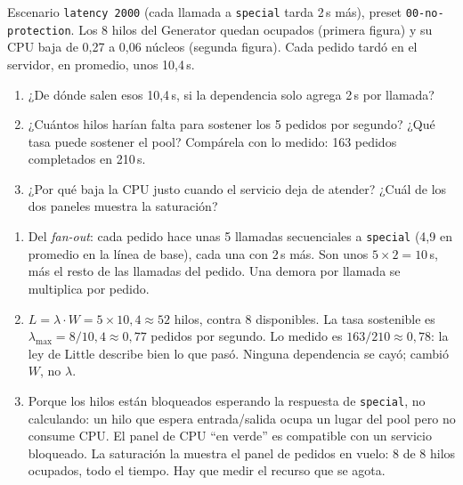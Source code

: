 \documentclass[variant=guia,cover=institutional,mode=screen]{ua-engineering-v6-article}
\begin{document}
\begin{uaexercise}
Escenario \texttt{latency 2000} (cada llamada a \texttt{special} tarda 2\,s más), preset \texttt{00-no-protection}. Los 8 hilos del Generator quedan ocupados (primera figura) y su CPU baja de 0,27 a 0,06 núcleos (segunda figura). Cada pedido tardó en el servidor, en promedio, unos 10,4\,s.
\begin{enumerate}
\item ¿De dónde salen esos 10,4\,s, si la dependencia solo agrega 2\,s por llamada?
\item ¿Cuántos hilos harían falta para sostener los 5 pedidos por segundo? ¿Qué tasa puede sostener el pool? Compárela con lo medido: 163 pedidos completados en 210\,s.
\item ¿Por qué baja la CPU justo cuando el servicio deja de atender? ¿Cuál de los dos paneles muestra la saturación?
\end{enumerate}
\end{uaexercise}
\begin{uaanswer}
\begin{enumerate}
\item Del \emph{fan-out}: cada pedido hace unas 5 llamadas secuenciales a \texttt{special} (4,9 en promedio en la línea de base), cada una con 2\,s más. Son unos $5 \times 2 = 10$\,s, más el resto de las llamadas del pedido. Una demora por llamada se multiplica por pedido.
\item $L = \lambda \cdot W = 5 \times 10{,}4 \approx 52$ hilos, contra 8 disponibles. La tasa sostenible es $\lambda_{\max} = 8 / 10{,}4 \approx 0{,}77$ pedidos por segundo. Lo medido es $163 / 210 \approx 0{,}78$: la ley de Little describe bien lo que pasó. Ninguna dependencia se cayó; cambió $W$, no $\lambda$.
\item Porque los hilos están bloqueados esperando la respuesta de \texttt{special}, no calculando: un hilo que espera entrada/salida ocupa un lugar del pool pero no consume CPU. El panel de CPU ``en verde'' es compatible con un servicio bloqueado. La saturación la muestra el panel de pedidos en vuelo: 8 de 8 hilos ocupados, todo el tiempo. Hay que medir el recurso que se agota.
\end{enumerate}
\end{uaanswer}
\end{document}
